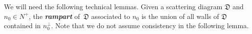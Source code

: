 \documentclass{amsart}
\theoremstyle{definition}
\theoremstyle{remark}
\numberwithin{equation}{section}
\newcommand{\newword}[1]{\textbf{\emph{#1}}}
\newcommand{\D}{{\mathfrak D}}
\newcommand{\0}{{\mathbf{0}}}
\renewcommand{\d}{{\mathfrak d}}
\begin{document}
%
We will need the following technical lemmas.
Given a scattering diagram $\D$ and $n_0\in N^+$, the \newword{rampart} of~$\D$ associated to $n_0$ is the union of all walls of $\D$ contained in $n_0^\perp$.
Note that we do not assume consistency in the following lemma.
\end{document}
